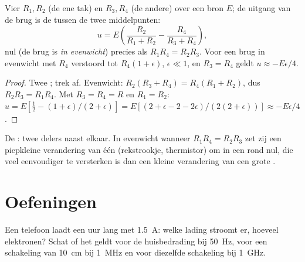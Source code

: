 \begin{proposition}\label{prop:b1:dc-circuits:wheatstone}
Vier  $R_1, R_2$ (de ene tak) en $R_3, R_4$ (de andere) over
een bron $E$; de uitgang van de brug is de  tussen de twee
middelpunten:
\[
u = E\left(\frac{R_2}{R_1 + R_2} - \frac{R_4}{R_3 + R_4}\right),
\]
nul (de brug is \emph{in evenwicht}) precies als $R_1R_4 = R_2R_3$. Voor een
brug in evenwicht met $R_4$ verstoord tot $R_4(1 + \epsilon)$, $\epsilon
\ll 1$, en $R_3 = R_4$ geldt $u \approx -E\epsilon/4$.
\end{proposition}

\begin{proof}
Twee ; trek af. Evenwicht: $R_2(R_3 + R_4) = R_4(R_1 +
R_2)$, dus $R_2R_3 = R_1R_4$. Met $R_3 = R_4 = R$ en $R_1 = R_2$:
$u = E[\tfrac12 - (1 + \epsilon)/(2 + \epsilon)] = E[(2 + \epsilon - 2 -
2\epsilon)/(2(2 + \epsilon))] \approx -E\epsilon/4$.
\end{proof}

\begin{omfigure}

{\small De : twee delers naast elkaar. In evenwicht wanneer
$R_1R_4 = R_2R_3$ zet zij een piepkleine verandering van één 
(rekstrookje, thermistor) om in een  rond nul, die veel
eenvoudiger te versterken is dan een kleine verandering van een grote .}
\end{omfigure}

\section{Oefeningen}

\begin{exercise}[$\star$]\label{exo:b1:dc-circuits:1}
Een telefoon laadt een uur lang met \qty{1.5}{A}: welke lading stroomt er, hoeveel
elektronen? Schat of het  geldt voor de
huisbedrading bij \qty{50}{Hz}, voor een schakeling van \qty{10}{cm} bij \qty{1}{MHz}
en voor diezelfde schakeling bij \qty{1}{GHz}.
\end{exercise}

